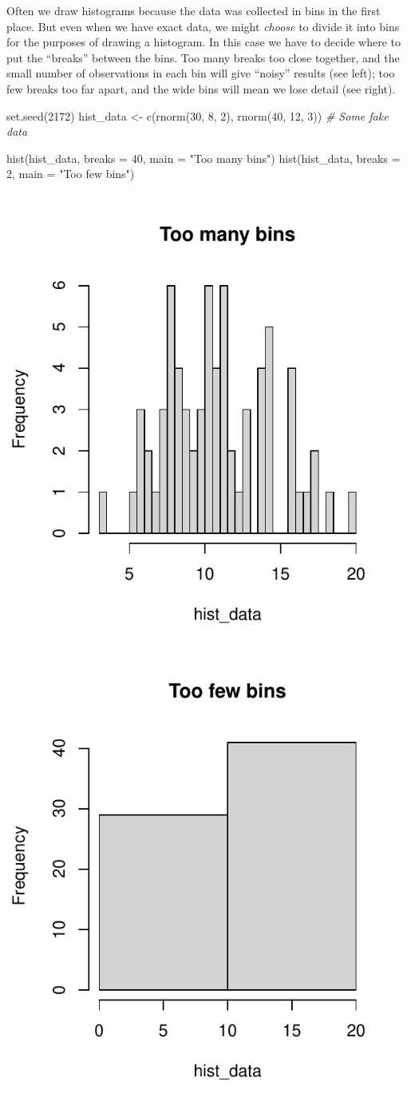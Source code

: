 \documentclass[
  a4paper,
]{book}
\newenvironment{Shaded}{\begin{snugshade}}{\end{snugshade}}
\newcommand{\AttributeTok}[1]{\textcolor[rgb]{0.77,0.63,0.00}{#1}}
\newcommand{\CommentTok}[1]{\textcolor[rgb]{0.56,0.35,0.01}{\textit{#1}}}
\newcommand{\DecValTok}[1]{\textcolor[rgb]{0.00,0.00,0.81}{#1}}
\newcommand{\FunctionTok}[1]{\textcolor[rgb]{0.00,0.00,0.00}{#1}}
\newcommand{\NormalTok}[1]{#1}
\newcommand{\OtherTok}[1]{\textcolor[rgb]{0.56,0.35,0.01}{#1}}
\newcommand{\StringTok}[1]{\textcolor[rgb]{0.31,0.60,0.02}{#1}}
\theoremstyle{definition}
\theoremstyle{definition}
\theoremstyle{definition}
\theoremstyle{definition}
\theoremstyle{remark}
\begin{document}
Often we draw histograms because the data was collected in bins in the first place. But even when we have exact data, we might \emph{choose} to divide it into bins for the purposes of drawing a histogram. In this case we have to decide where to put the ``breaks'' between the bins. Too many breaks too close together, and the small number of observations in each bin will give ``noisy'' results (see left); too few breaks too far apart, and the wide bins will mean we lose detail (see right).

\begin{Shaded}
\begin{Highlighting}[]
\FunctionTok{set.seed}\NormalTok{(}\DecValTok{2172}\NormalTok{)}
\NormalTok{hist\_data }\OtherTok{\textless{}{-}} \FunctionTok{c}\NormalTok{(}\FunctionTok{rnorm}\NormalTok{(}\DecValTok{30}\NormalTok{, }\DecValTok{8}\NormalTok{, }\DecValTok{2}\NormalTok{), }\FunctionTok{rnorm}\NormalTok{(}\DecValTok{40}\NormalTok{, }\DecValTok{12}\NormalTok{, }\DecValTok{3}\NormalTok{))  }\CommentTok{\# Some fake data}

\FunctionTok{hist}\NormalTok{(hist\_data, }\AttributeTok{breaks =} \DecValTok{40}\NormalTok{, }\AttributeTok{main =} \StringTok{"Too many bins"}\NormalTok{)}
\FunctionTok{hist}\NormalTok{(hist\_data, }\AttributeTok{breaks =} \DecValTok{2}\NormalTok{,  }\AttributeTok{main =} \StringTok{"Too few bins"}\NormalTok{)}
\end{Highlighting}
\end{Shaded}

\includegraphics[width=0.48\linewidth]{math1710_files/figure-latex/hist-bins-1} \includegraphics[width=0.48\linewidth]{math1710_files/figure-latex/hist-bins-2}
\end{document}
